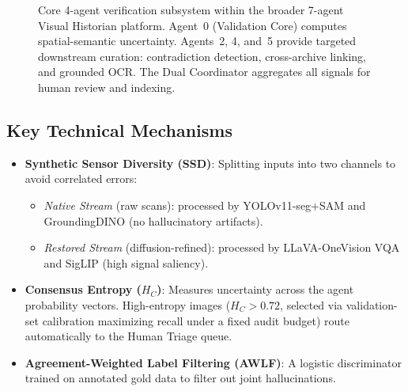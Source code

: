 \documentclass[11pt,a4paper]{article}
\newcommand{\term}[1]{\textbf{#1}}
\begin{document}
\begin{figure}[t]

\caption{
Core 4-agent verification subsystem within the broader 7-agent Visual Historian platform.
Agent~0 (Validation Core) computes spatial-semantic uncertainty.
Agents~2, 4, and~5 provide targeted downstream curation:
contradiction detection, cross-archive linking, and grounded OCR.
The Dual Coordinator aggregates all signals for human review and indexing.
}
\label{fig:compact_architecture}

\end{figure}

\subsection{Key Technical Mechanisms}
\begin{itemize}[leftmargin=*]
    \item \term{Synthetic Sensor Diversity (SSD)}: Splitting inputs into two channels to avoid correlated errors:
    \begin{itemize}[noitemsep]
        \item \textit{Native Stream} (raw scans): processed by YOLOv11-seg+SAM and GroundingDINO (no hallucinatory artifacts).
        \item \textit{Restored Stream} (diffusion-refined): processed by LLaVA-OneVision VQA and SigLIP (high signal saliency).
    \end{itemize}
    \item \term{Consensus Entropy ($H_C$)}: Measures uncertainty across the agent probability vectors. High-entropy images ($H_C > 0.72$, selected via validation-set calibration maximizing recall under a fixed audit budget) route automatically to the Human Triage queue.
    \item \term{Agreement-Weighted Label Filtering (AWLF)}: A logistic discriminator trained on annotated gold data to filter out joint hallucinations.
\end{itemize}
\end{document}
